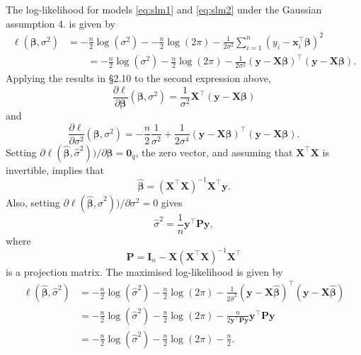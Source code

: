 \documentclass[]{book}
\theoremstyle{definition}
\theoremstyle{definition}
\theoremstyle{definition}
\theoremstyle{remark}
\begin{document}
The log-likelihood for models \eqref{eq:slm1} and \eqref{eq:slm2} under the Gaussian assumption 4. is given by
\begin{align*}
\ell(\boldsymbol \beta, \sigma^2)&=-\frac{n}{2}\log (\sigma^2)--\frac{n}{2}\log(2\pi)-\frac{1}{2\sigma^2} \sum_{i=1}^n (y_i-\boldsymbol x_i^\top \boldsymbol \beta)^2\\
& \qquad = -\frac{n}{2}\log (\sigma^2)-\frac{n}{2}\log(2\pi)-\frac{1}{2\sigma^2} (\boldsymbol y- \boldsymbol X\boldsymbol \beta)^\top (\boldsymbol y- \boldsymbol X\boldsymbol \beta).
\end{align*}
Applying the results in \S 2.10 to the second expression above,
\[
\frac{\partial \ell}{\partial \boldsymbol \beta}(\boldsymbol \beta, \sigma^2)=\frac{1}{\sigma^2}\boldsymbol X^\top (\boldsymbol y- \boldsymbol X\boldsymbol \beta)
\]
and
\[
\frac{\partial \ell}{\partial \sigma^2}(\boldsymbol \beta, \sigma^2)=-\frac{n}{2}\frac{1}{\sigma^2}+\frac{1}{2\sigma^4}
 (\boldsymbol y- \boldsymbol X\boldsymbol \beta)^\top (\boldsymbol y- \boldsymbol X\boldsymbol \beta).
\]
Setting \(\partial \ell(\hat{\boldsymbol \beta}, \hat{\sigma}^2))/\partial \boldsymbol \beta={\mathbf 0}_q\), the zero vector, and assuming that \(\boldsymbol X^\top \boldsymbol X\) is invertible, implies that
\begin{equation}
\hat{\boldsymbol \beta}=\left (\boldsymbol X^\top \boldsymbol X\right )^{-1}\boldsymbol X^\top \boldsymbol y.
\label{eq:uni1}
\end{equation}
Also, setting \(\partial \ell(\hat{\boldsymbol \beta}, \hat{\sigma}^2))/\partial \sigma^2=0\) gives
\begin{equation}
\hat{\sigma}^2 = \frac{1}{n}\boldsymbol y^\top \boldsymbol P\boldsymbol y,
\label{eq:uni2}
\end{equation}
where
\begin{equation}
\boldsymbol P=\boldsymbol I_n - \boldsymbol X\left ( \boldsymbol X^\top \boldsymbol X\right)^{-1}\boldsymbol X^\top
\label{eq:defP}
\end{equation}
is a projection matrix. The maximised log-likelihood is given by
\begin{align*}
\ell(\hat{\boldsymbol \beta}, \hat{\sigma}^2)&= -\frac{n}{2}\log(\hat{\sigma}^2)-\frac{n}{2}\log(2\pi) -\frac{1}{2\hat{\sigma}^2}(\boldsymbol y- \boldsymbol X\hat{\boldsymbol \beta})^\top (\boldsymbol y- \boldsymbol X\hat{\boldsymbol \beta})\\
&= -\frac{n}{2}\log(\hat{\sigma}^2)-\frac{n}{2}\log(2\pi)-\frac{n}{2\boldsymbol y^\top \boldsymbol P\boldsymbol y}\boldsymbol y^\top \boldsymbol P\boldsymbol y\\
&=-\frac{n}{2}\log(\hat{\sigma}^2)-\frac{n}{2}\log(2\pi)-\frac{n}{2}.
\end{align*}
\end{document}
